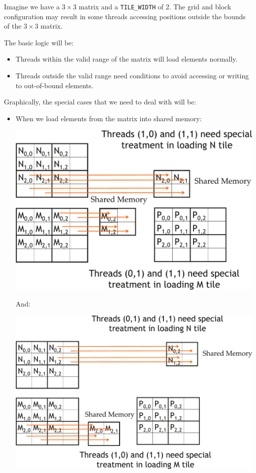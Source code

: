 \begin{examplebox}
    Imagine we have a $3 \times 3$ matrix and a \texttt{TILE\_WIDTH} of 2. The grid and block configuration may result in some threads accessing positions outside the bounds of the $3 \times 3$ matrix.

    The basic logic will be:
    \begin{itemize}
        \item Threads within the valid range of the matrix will load elements normally.
        \item Threads outside the valid range need conditions to avoid accessing or writing to out-of-bound elements.
    \end{itemize}

    Graphically, the special cases that we need to deal with will be:
    \begin{itemize}
        \item When we load elements from the matrix into shared memory:
        \begin{center}
            \includegraphics[width=.8\textwidth]{img/cuda-any-size-tile-1.pdf}
        \end{center}
        And:
        \begin{center}
            \includegraphics[width=.8\textwidth]{img/cuda-any-size-tile-2.pdf}
        \end{center}


\end{itemize}
\end{examplebox}
